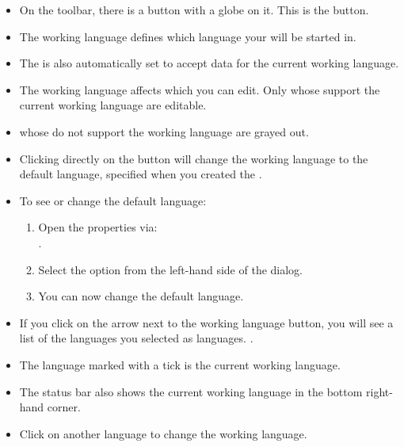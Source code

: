 
\label{tasksworkinglang}
\begin{itemize}
\item On the toolbar, there is a button with a globe on it. This is the  button. 
\item The working language defines which  language your \gdaut{} will be started in.
\item The \gddatasetsview{} is also automatically set to accept data for the current working language.
\item The working language affects which \gdsuites{} you can edit. Only \gdsuites{} whose \gdauts{} support the current working language are editable. 
\item \gdsuites{} whose \gdauts{} do not support the working language are grayed out. 
\item Clicking directly on the button will change the working language to the default language, specified when you created the \gdproject{}.
\item To see or change the default language:
\begin{enumerate}
\item Open the \gdproject{} properties via:\\
.
\item Select the \gdproject{} option from the left-hand side of the dialog. 
\item You can now change the default language. 
\end{enumerate}
\item If you click on the arrow next to the working language button, you will see a list of the languages you selected as \gdproject{} languages. 
.
\item The language marked with a tick is the current working language. 
\item The status bar also shows the current working language in the bottom right-hand corner. 
\item Click on another language to change the working language. 
\end{itemize}

